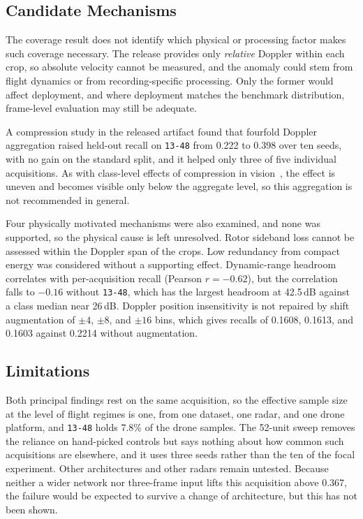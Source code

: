 \documentclass[conference]{IEEEtran}
\begin{document}
\subsection{Candidate Mechanisms}
\label{sec:discussion}

The coverage result does not identify which physical or processing factor makes such coverage necessary. The release provides only \emph{relative} Doppler within each crop, so absolute velocity cannot be measured, and the anomaly could stem from flight dynamics or from recording-specific processing. Only the former would affect deployment, and where deployment matches the benchmark distribution, frame-level evaluation may still be adequate.

A compression study in the released artifact found that fourfold Doppler aggregation raised held-out recall on \texttt{13-48} from 0.222 to 0.398 over ten seeds, with no gain on the standard split, and it helped only three of five individual acquisitions. As with class-level effects of compression in vision~\cite{hooker2019,tran2022}, the effect is uneven and becomes visible only below the aggregate level, so this aggregation is not recommended in general.

Four physically motivated mechanisms were also examined, and none was supported, so the physical cause is left unresolved. Rotor sideband loss cannot be assessed within the Doppler span of the crops. Low redundancy from compact energy was considered without a supporting effect. Dynamic-range headroom correlates with per-acquisition recall (Pearson $r=-0.62$), but the correlation falls to $-0.16$ without \texttt{13-48}, which has the largest headroom at 42.5\,dB against a class median near 26\,dB. Doppler position insensitivity is not repaired by shift augmentation of $\pm4$, $\pm8$, and $\pm16$ bins, which gives recalls of 0.1608, 0.1613, and 0.1603 against 0.2214 without augmentation.

\subsection{Limitations}

Both principal findings rest on the same acquisition, so the effective sample size at the level of flight regimes is one, from one dataset, one radar, and one drone platform, and \texttt{13-48} holds 7.8\% of the drone samples. The 52-unit sweep removes the reliance on hand-picked controls but says nothing about how common such acquisitions are elsewhere, and it uses three seeds rather than the ten of the focal experiment. Other architectures and other radars remain untested. Because neither a wider network nor three-frame input lifts this acquisition above 0.367, the failure would be expected to survive a change of architecture, but this has not been shown.
\end{document}
